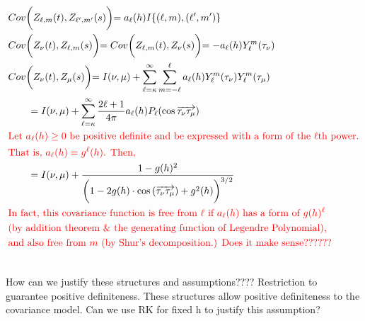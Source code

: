 \documentclass[11pt]{article}
\begin{document}
\begin{itemize}
\begin{align*}
&Cov\biggl( Z_{\ell,m}(t), Z_{\ell',m'}(s) \biggl) = a_{\ell}(h) I\{(\ell,m),(\ell',m')\}\\
&Cov\biggl( Z_{\nu}(t), Z_{\ell,m}(s) \biggl) = Cov\biggl( Z_{\ell,m}(t), Z_{\nu}(s) \biggl) = -a_{\ell}(h) Y_{\ell}^{m}(\tau_{\nu})\\
&Cov\biggl( Z_{\nu}(t), Z_{\mu}(s) \biggl) = I(\nu,\mu) + \sum_{\ell=\kappa}^{\infty} \sum_{m=-\ell}^{\ell} a_{\ell}(h) Y_{\ell}^{m}(\tau_{\nu}) Y_{\ell}^{m}(\tau_{\mu})\\
&\quad \quad = I(\nu,\mu) + \sum_{\ell=\kappa}^{\infty} \frac{2\ell +1}{4\pi} a_{\ell}(h)  P_{\ell}(\cos{\overrightarrow{\tau_{\nu} \tau_{\mu}}}) \\
&\text{{\color{red} Let $a_{\ell}(h) \ge 0$ be positive definite and be expressed with a form of the $\ell$th power.}}\\
&\text{{\color{red} That is, $a_{\ell}(h) = g^{\ell}(h)$. Then, }}\\
& \quad \quad = I(\nu,\mu) + \frac{1-g(h)^2}{\biggl(1-2 g(h) \cdot \cos{(\overrightarrow{\tau_{\nu} \tau_{\mu}})} + g^2(h)\biggl)^{3/2}}\\
&\text{\color{red} In fact, this covariance function is free from $\ell$ if $a_{\ell}(h)$ has a form of $g(h)^{\ell}$}\\
&\text{\color{red} (by addition theorem \& the generating function of Legendre Polynomial), }\\
&\text{\color{red} and also free from $m$ (by Shur's decomposition.) Does it make sense??????}\\
\\
\end{align*}

\pagebreak

{\color{red} How can we justify these structures and assumptions???? Restriction to guarantee positive definiteness. These structures allow positive definiteness to the covariance model. Can we use RK for fixed h to justify this assumption?}\\


\end{itemize}
\end{document}
